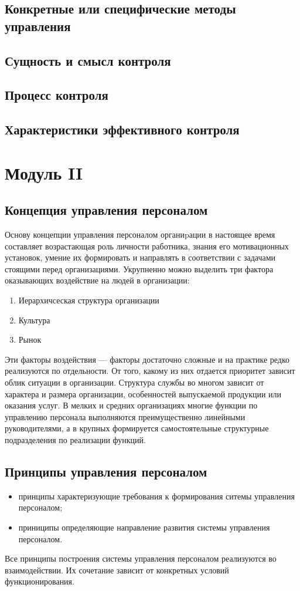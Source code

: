 \documentclass[a4paper,12pt,oneside,final]{extarticle}
\numberwithin{equation}{section}
\begin{document}
\subsection{Конкретные или специфические методы управления}

\subsection{Сущность и смысл контроля}

\subsection{Процесс контроля}

\subsection{Характеристики эффективного контроля}

%
%
\section{Модуль II}
\subsection{Концепция управления персоналом}
Основу концепции управления персоналом органиpации в настоящее время составляет возрастающая роль личности работника, знания его мотивационных установок, умение их формировать и направлять в соответствии с задачами стоящими перед организациями. 
Укрупненно можно выделить три фактора оказывающих воздействие на людей в организации:
\begin{enumerate}
	\item Иерархичсеская структура организации
	\item Культура
	\item Рынок
\end{enumerate}
Эти факторы воздействия --- факторы достаточно сложные и на практике редко реализуются по отдельности. 
От того, какому из них отдается приоритет зависит облик ситуации в организации.
Структура службы во многом зависит от характера и размера организации, особенностей выпускаемой продукции или оказания услуг.
В мелких и средних организациях многие функции по управлению персонала выполняются преимущественно линейными руководителями, а в крупных формируется самостоятельные структурные подразделения по реализации функций.

\subsection{Принципы управления персоналом}
\begin{itemize}
	\item принципы характеризующие требования к формирования ситемы управления персоналом;
	\item приниципы определяющие направление развития системы управления персоналом.
\end{itemize}
Все принципы построения системы управления персоналом реализуются во взаимодействии. Их сочетание зависит от конкретных условий функционирования.
\end{document}
